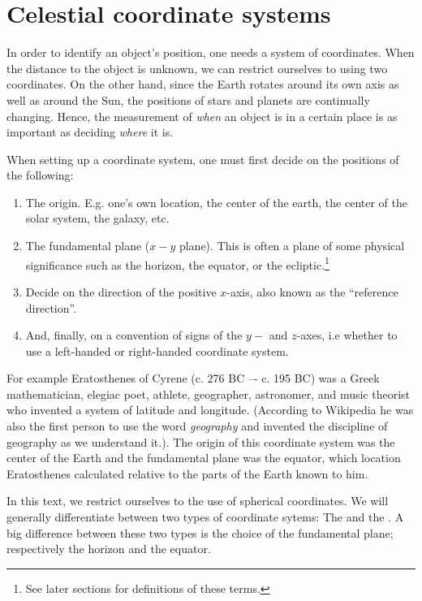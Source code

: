 \chapter{Celestial coordinate systems}

In order to identify an object's position, one needs a system of coordinates.
When the distance to the object is unknown, we can restrict ourselves to using two
coordinates. 
On the other hand, since the Earth rotates around its 
own axis as well as around the Sun, the positions of stars and planets 
are continually changing. Hence, the measurement of {\it when} an object 
is in a certain place is as important as deciding {\it where} it is. 

When setting up a coordinate system, one must first decide on the positions
of the following:
\begin{enumerate}
\item The origin. E.g. one's own location, the center of the earth,
the center of the solar system, the galaxy, etc. 
\item The fundamental plane ($x-y$ plane). This is often a plane of some
	physical significance such as the horizon, the equator, or the
	ecliptic.\footnote{See later sections for definitions of these terms.}
\item Decide on the direction of the positive $x$-axis, also known as
the ``reference direction''. 
\item And, finally, on a convention of signs of the $y-$ and $z$-axes, i.e whether
to use a left-handed or right-handed coordinate system.
\end{enumerate}

For example Eratosthenes of Cyrene (c. 276 BC –- c. 195 BC) was a Greek mathematician, elegiac poet, athlete, geographer, astronomer, and music theorist who invented a system of latitude
and longitude. (According to Wikipedia he was also the first person to use the word {\it geography} and invented the discipline of geography as we understand it.). The origin of 
this coordinate system was the center of the Earth and the fundamental plane was the 
equator, which location Eratosthenes calculated relative to the parts of the Earth known
to him. 

In this text, we restrict ourselves to the use of spherical coordinates. We will generally
differentiate between two types of coordinate sytems: The  and
the . A big difference between these two types
is the choice of the fundamental plane; respectively the horizon and the equator.

